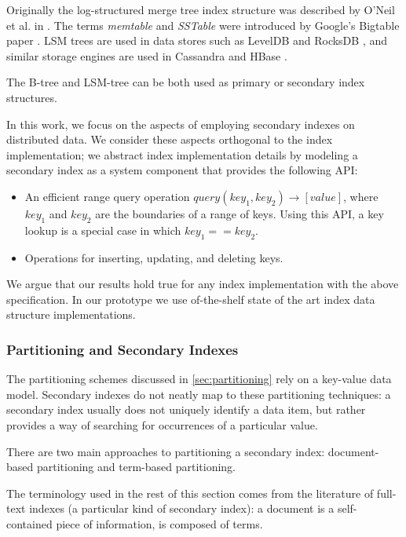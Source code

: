 Originally the log-structured merge tree index structure was described by O'Neil et al. in \cite{oneil:lsmtree}.
The terms \textit{memtable} and \textit{SSTable} were introduced by Google's Bigtable paper \cite{chang:bigtable}.
LSM trees are used in data stores such as LevelDB \cite{leveldb:implnotes} and RocksDB \cite{rocksdb:history},
and similar storage engines are used in Cassandra and HBase \cite{hbase:hfile}.

\bigskip
\noindent
The B-tree and LSM-tree can be both used as primary or secondary index structures.

In this work, we focus on the aspects of employing secondary indexes on distributed data.
We consider these aspects orthogonal to the index implementation;
we abstract index implementation details by modeling a secondary index as a system component that provides the following
API:
\begin{itemize}

  \item An efficient range query operation $query(key_1, key_2) \rightarrow [value]$,
  where $key_1$ and $key_2$ are the boundaries of a range of keys.
  Using this API, a key lookup is a special case in which $key_1 == key_2$.

  \item Operations for inserting, updating, and deleting keys.

\end{itemize}

We argue that our results hold true for any index implementation with the above specification.
In our prototype
we use of-the-shelf state of the art index data structure implementations.

\subsubsection{Partitioning and Secondary Indexes}
\label{sec:index_partitioning_background}
The partitioning schemes discussed in \ref{sec:partitioning} rely on a key-value data model.
Secondary indexes do not neatly map to these partitioning techniques:
a secondary index usually does not uniquely identify a data item, but rather provides a way of searching for occurrences
of a particular value.

There are two main approaches to partitioning a secondary index:
document-based partitioning and term-based partitioning.

The terminology used in the rest of this section comes from the literature of full-text indexes
(a particular kind of secondary index):
a document is a self-contained piece of information, is composed of terms.

